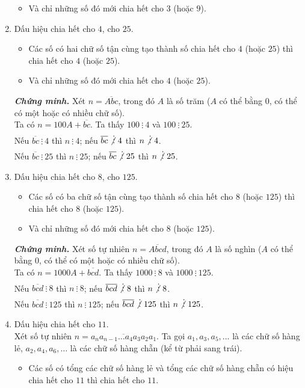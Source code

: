 \begin{enumerate}
\begin{itemize}
  \item Và chỉ những số đó mới chia hết cho $3$ (hoặc $9$).
 \end{itemize}
 \item Dấu hiệu chia hết cho $4$, cho $25$.
 \begin{itemize}
  \item Các số có hai chữ số tận cùng tạo thành số chia hết cho $4$ (hoặc $25$) thì chia hết cho $4$ (hoặc $25$).
  \item Và chỉ những số đó mới chia hết cho $4$ (hoặc $25$).
 \end{itemize}
 {\textit{\textbf{Chứng minh.}}} Xét $n=\overline{Abc}$, trong đó $A$ là số trăm ($A$ có thể bằng $0$, có thể có một hoặc có nhiều chữ số).\\
 Ta có $n=100A+\overline{bc}$. Ta thấy $100\ \vdots\ 4$ và $100\ \vdots\ 25$.\\
 Nếu $\overline{bc}\ \vdots\ 4$ thì $n\ \vdots\ 4$; nếu $\overline{bc}\not\vdots\ 4$ thì $n \not\vdots\ 4$.\\
 Nếu $\overline{bc}\ \vdots\ 25$ thì $n\ \vdots\ 25$; nếu $\overline{bc}\not\vdots\ 25$ thì $n \not\vdots\ 25$.
 \item Dấu hiệu chia hết cho $8$, cho $125$.
 \begin{itemize}
  \item Các số có ba chữ số tận cùng tạo thành số chia hết cho $8$ (hoặc $125$) thì chia hết cho $8$ (hoặc $125$).
  \item Và chỉ những số đó mới chia hết cho $8$ (hoặc $125$).
 \end{itemize}
 {\textit{\textbf{Chứng minh.}}} Xét số tự nhiên $n=\overline{Abcd}$, trong đó $A$ là số nghìn ($A$ có thể bằng $0$, có thể có một hoặc có nhiều chữ số).\\
 Ta có $n=1000A+\overline{bcd}$. Ta thấy $1000\ \vdots\ 8$ và $1000\ \vdots\ 125$.\\
 Nếu $\overline{bcd}\ \vdots\ 8$ thì $n\ \vdots\ 8$; nếu $\overline{bcd}\not\vdots\ 8$ thì $n \not\vdots\ 8$.\\
 Nếu $\overline{bcd}\ \vdots\ 125$ thì $n\ \vdots\ 125$; nếu $\overline{bcd}\not\vdots\ 125$ thì $n \not\vdots\ 125$.
 \item Dấu hiệu chia hết cho $11$.\\
 Xét số tự nhiên $n=\overline{a_na_{n-1}\ldots a_4a_3a_2a_1}$. Ta gọi $a_1,a_3,a_5,\ldots$ là các chữ số hàng lẻ, $a_2,a_4,a_6,\ldots$ là các chữ số hàng chẵn (kể từ phải sang trái).
 \begin{itemize}
  \item Các số có tổng các chữ số hàng lẻ và tổng các chữ số hàng chẵn có hiệu chia hết cho $11$ thì chia hết cho $11$.

\end{itemize}
\end{enumerate}
